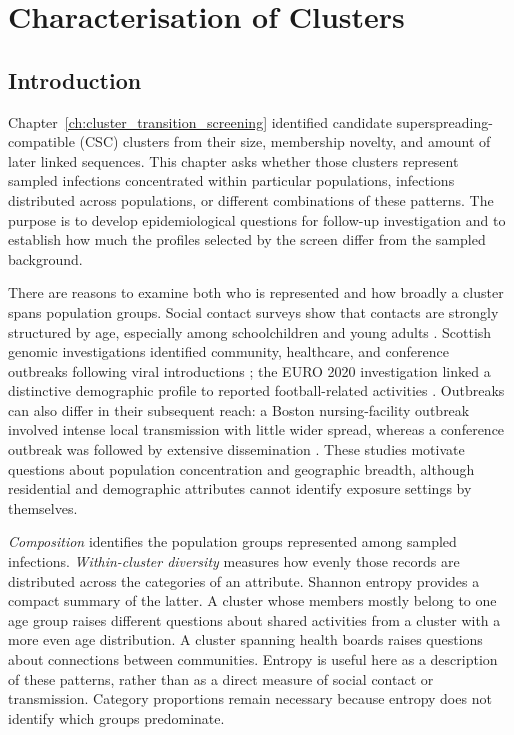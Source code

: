 \chapter{Characterisation of Clusters}\label{ch:candidate_characterisation}

\section{Introduction}\label{sec:ch6_introduction}

Chapter~\ref{ch:cluster_transition_screening} identified candidate superspreading-compatible (CSC) clusters from their size, membership novelty, and amount of later linked sequences. This chapter asks whether those clusters represent sampled infections concentrated within particular populations, infections distributed across populations, or different combinations of these patterns. The purpose is to develop epidemiological questions for follow-up investigation and to establish how much the profiles selected by the screen differ from the sampled background.

There are reasons to examine both who is represented and how broadly a cluster spans population groups. Social contact surveys show that contacts are strongly structured by age, especially among schoolchildren and young adults \citep{Mossong2008}. Scottish genomic investigations identified community, healthcare, and conference outbreaks following viral introductions \citep{daSilvaFilipe2020}; the EURO 2020 investigation linked a distinctive demographic profile to reported football-related activities \citep{Marsh2021}. Outbreaks can also differ in their subsequent reach: a Boston nursing-facility outbreak involved intense local transmission with little wider spread, whereas a conference outbreak was followed by extensive dissemination \citep{Lemieux2021}. These studies motivate questions about population concentration and geographic breadth, although residential and demographic attributes cannot identify exposure settings by themselves.

\emph{Composition} identifies the population groups represented among sampled infections. \emph{Within-cluster diversity} measures how evenly those records are distributed across the categories of an attribute. Shannon entropy provides a compact summary of the latter. A cluster whose members mostly belong to one age group raises different questions about shared activities from a cluster with a more even age distribution. A cluster spanning health boards raises questions about connections between communities. Entropy is useful here as a description of these patterns, rather than as a direct measure of social contact or transmission. Category proportions remain necessary because entropy does not identify which groups predominate.

